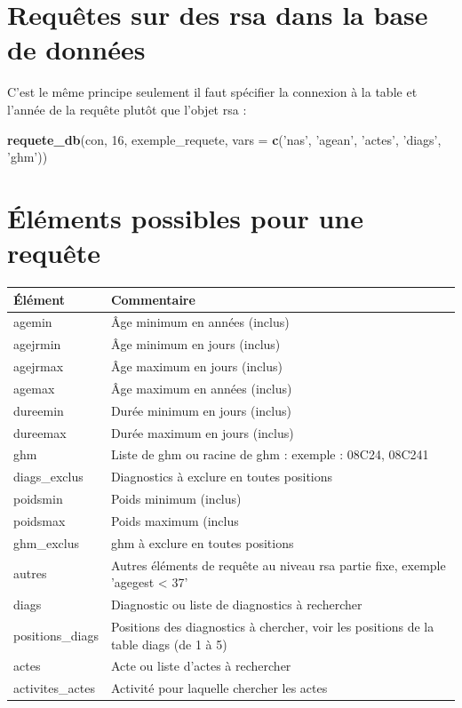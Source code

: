 \documentclass[]{book}
\newenvironment{Shaded}{\begin{snugshade}}{\end{snugshade}}
\newcommand{\KeywordTok}[1]{\textcolor[rgb]{0.13,0.29,0.53}{\textbf{#1}}}
\newcommand{\DataTypeTok}[1]{\textcolor[rgb]{0.13,0.29,0.53}{#1}}
\newcommand{\DecValTok}[1]{\textcolor[rgb]{0.00,0.00,0.81}{#1}}
\newcommand{\StringTok}[1]{\textcolor[rgb]{0.31,0.60,0.02}{#1}}
\newcommand{\NormalTok}[1]{#1}
\begin{document}
\section{Requêtes sur des rsa dans la base de
données}\label{requetes-sur-des-rsa-dans-la-base-de-donnees}

C'est le même principe seulement il faut spécifier la connexion à la
table et l'année de la requête plutôt que l'objet rsa :

\begin{Shaded}
\begin{Highlighting}[]
\KeywordTok{requete_db}\NormalTok{(con, }\DecValTok{16}\NormalTok{, exemple_requete, }\DataTypeTok{vars =} \KeywordTok{c}\NormalTok{(}\StringTok{'nas'}\NormalTok{, }\StringTok{'agean'}\NormalTok{, }\StringTok{'actes'}\NormalTok{, }\StringTok{'diags'}\NormalTok{, }\StringTok{'ghm'}\NormalTok{))}
\end{Highlighting}
\end{Shaded}

\section{Éléments possibles pour une
requête}\label{elements-possibles-pour-une-requete}

\begin{tabular}{l|l}
\hline
Élément & Commentaire\\
\hline
agemin & Âge minimum en années (inclus)\\
\hline
agejrmin & Âge minimum en jours (inclus)\\
\hline
agejrmax & Âge maximum en jours (inclus)\\
\hline
agemax & Âge maximum en années (inclus)\\
\hline
dureemin & Durée minimum en jours (inclus)\\
\hline
dureemax & Durée maximum en jours (inclus)\\
\hline
ghm & Liste de ghm ou racine de ghm : exemple : 08C24, 08C241\\
\hline
diags\_exclus & Diagnostics à exclure en toutes positions\\
\hline
poidsmin & Poids minimum (inclus)\\
\hline
poidsmax & Poids maximum (inclus\\
\hline
ghm\_exclus & ghm à exclure en toutes positions\\
\hline
autres & Autres éléments de requête au niveau rsa partie fixe, exemple 'agegest < 37'\\
\hline
diags & Diagnostic ou liste de diagnostics à rechercher\\
\hline
positions\_diags & Positions des diagnostics à chercher, voir les positions de la table diags (de 1 à 5)\\
\hline
actes & Acte ou liste d'actes à rechercher\\
\hline
activites\_actes & Activité pour laquelle chercher les actes\\
\hline
\end{tabular}
\end{document}
